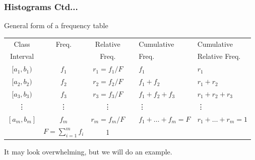 \documentclass[xcolor=svgnames, compress]{beamer}
\begin{document}
\begin{frame} %
\frametitle{Histograms Ctd...}
General form of a \alert{frequency table}
\vspace{-0.25cm}
\footnotesize
\begin{center}
\begin{tabular}{c c c c l l}
Class			&	Freq.		&	Relative			&	&	Cumulative				&	Cumulative	\\
Interval			&			&	Freq.				&  	&	Freq.						&	Relative Freq.	\\
\hline
$[a_{1}, b_{1})$		&	$f_{1}$	&	$r_{1} = f_{1} / F$	& 	&	$f_{1}$					&	$r_{1}$\\
$[a_{2}, b_{2})$		&	$f_{2}$	&	$r_{2} = f_{2} / F$	&  	&	$f_{1} + f_{2}$				&	$r_{1}+r_{2}$\\
$[a_{3}, b_{3})$		&	$f_{3}$	&	$r_{3} = f_{3} / F$	& 	&	$f_{1} + f_{2} + f_{3}$		&	$r_{1}+r_{2}+r_{3}$\\
\vdots			&	\vdots	&	\vdots			&  	&	\hspace{0.75cm} \vdots		&	\hspace{0.75cm} \vdots\\
$[a_{m}, b_{m}]$	&	$f_{m}$	&	$r_{m} = f_{m} / F$	& 	&	$f_{1} + \ldots + f_{m} = F$	&	$r_{1} + \ldots + r_{m} = 1$\\
\hline
				&	$F = \displaystyle\sum_{i=1}^{m} f_{i}$ & 1 \\
\end{tabular}
\end{center}


It may look overwhelming, but we will do an example.

\end{frame}




\end{document}

